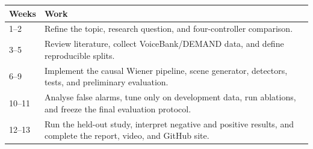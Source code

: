 \documentclass[11pt,a4paper]{article}
\begin{document}
\begin{tabularx}{\textwidth}{|p{2.4cm}|X|}
\hline
\textbf{Weeks} & \textbf{Work} \\
\hline
1--2 & Refine the topic, research question, and four-controller comparison. \\
\hline
3--5 & Review literature, collect VoiceBank/DEMAND data, and define reproducible splits. \\
\hline
6--9 & Implement the causal Wiener pipeline, scene generator, detectors, tests, and preliminary evaluation. \\
\hline
10--11 & Analyse false alarms, tune only on development data, run ablations, and freeze the final evaluation protocol. \\
\hline
12--13 & Run the held-out study, interpret negative and positive results, and complete the report, video, and GitHub site. \\
\hline
\end{tabularx}
\end{document}
